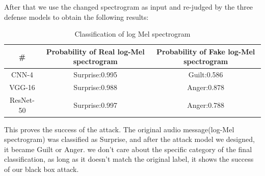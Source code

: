 After that we use the changed spectrogram as input and re-judged by the three defense models to obtain the following results:
\begin{table}[!h]
	\centering
	\begin{tabular}{c|c|c}
		\#        & Probability of Real log-Mel spectrogram & Probability of Fake log-Mel spectrogram \\ \hline
		CNN-4     & Surprise:0.995                          & Guilt:0.586                             \\
		VGG-16    & Surprise:0.988                          & Anger:0.878                             \\
		ResNet-50 & Surprise:0.997                          & Anger:0.788                            
	\end{tabular}
	\caption[Classification of log Mel spectrogram]{Classification of log Mel spectrogram}
	\label{tab:log-2}
\end{table}

This proves the success of the attack. The original audio message(log-Mel spectrogram) was classified as Surprise, and after the attack model we designed, it became Guilt or Anger. we don't care about the specific category of the final classification, as long as it doesn't match the original label, it shows the success of our black box attack.

